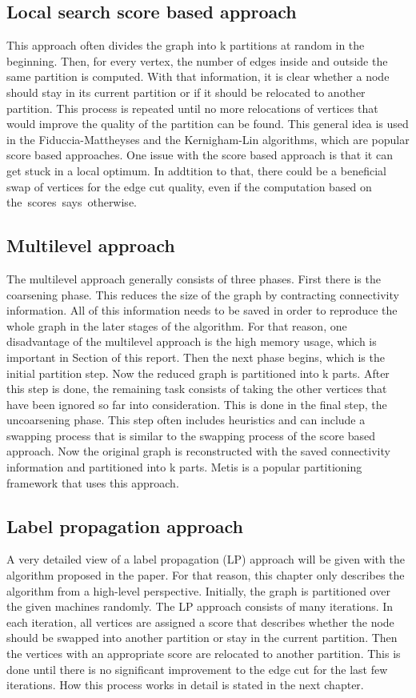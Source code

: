 \documentclass[acmsmall,nonacm,screen,review]{acmart}
\begin{document}
\subsection{Local search score based approach}
This approach often divides the graph into k partitions at random in the beginning. Then, for every vertex, the number of edges inside and outside the same partition is computed. With that information, it is clear whether a node should stay in its current partition or if it should be relocated to another partition. This process is repeated until no more relocations of vertices that would improve the quality of the partition can be found. This general idea is used in the Fiduccia-Mattheyses \cite{FM} and the Kernigham-Lin \cite{KL} algorithms, which are popular score based approaches. One issue with the score based approach is that it can get stuck in a local optimum. In addtition to that, there could be a beneficial swap of vertices for the edge cut quality, even if the computation based on \hbox{the scores says otherwise.}
\subsection{Multilevel approach}
The multilevel approach generally consists of three phases. First there is the coarsening phase. This reduces the size of the graph by contracting connectivity information. All of this information needs to be saved in order to reproduce the whole graph in the later stages of the algorithm. For that reason, one disadvantage of the multilevel approach is the high memory usage, which is important in Section  of this report. Then the next phase begins, which is the initial partition step. Now the reduced graph is partitioned into k parts. After this step is done, the remaining task consists of taking the other vertices that have been ignored so far into consideration. This is done in the final step, the uncoarsening phase. This step often includes heuristics and can include a swapping process that is similar to the swapping process of the score based approach. Now the original graph is reconstructed with the saved connectivity information and partitioned into k parts. Metis \cite{Metis} is a popular partitioning framework that uses this approach.
\subsection{Label propagation approach}
A very detailed view of a label propagation (LP) approach will be given with the algorithm proposed in the paper. For that reason, this chapter only describes the algorithm from a high-level perspective. Initially, the graph is partitioned over the given machines randomly. The LP approach consists of many iterations. In each iteration, all vertices are assigned a score that describes whether the node should be swapped into another partition or stay in the current partition. Then the vertices with an appropriate score are relocated to another partition. This is done until there is no significant improvement to the edge cut for the last few iterations. How this process works in detail is stated in the next chapter.
\end{document}
